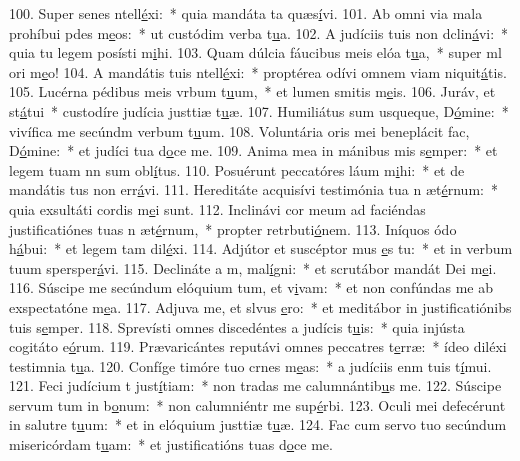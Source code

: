 100. Super senes ntell\uline{é}xi:~* quia mandáta ta quæs\uline{í}vi.
101. Ab omni via mala prohíbui pdes m\uline{e}os:~* ut custódim verba t\uline{u}a.
102. A judíciis tuis non dclin\uline{á}vi:~* quia tu legem posísti m\uline{i}hi.
103. Quam dúlcia fáucibus meis elóa t\uline{u}a,~* super ml ori m\uline{e}o!
104. A mandátis tuis ntell\uline{é}xi:~* proptérea odívi omnem viam niquit\uline{á}tis.
105. Lucérna pédibus meis vrbum t\uline{u}um,~* et lumen smitis m\uline{e}is.
106. Juráv, et st\uline{á}tui~* custodíre judícia justtiæ t\uline{u}æ.
107. Humiliátus sum usqueque, D\uline{ó}mine:~* vivífica me secúndm verbum t\uline{u}um.
108. Voluntária oris mei beneplácit fac, D\uline{ó}mine:~* et judíci tua d\uline{o}ce me.
109. Anima mea in mánibus mis s\uline{e}mper:~* et legem tuam nn sum obl\uline{í}tus.
110. Posuérunt peccatóres láum m\uline{i}hi:~* et de mandátis tus non err\uline{á}vi.
111. Hereditáte acquisívi testimónia tua n æt\uline{é}rnum:~* quia exsultáti cordis m\uline{e}i sunt.
112. Inclinávi cor meum ad faciéndas justificatiónes tuas n æt\uline{é}rnum,~* propter retrbuti\uline{ó}nem.
113. Iníquos ódo h\uline{á}bui:~* et legem tam dil\uline{é}xi.
114. Adjútor et suscéptor mus \uline{e}s tu:~* et in verbum tuum spersper\uline{á}vi.
115. Declináte a m, mal\uline{í}gni:~* et scrutábor mandát Dei m\uline{e}i.
116. Súscipe me secúndum elóquium tum, et v\uline{i}vam:~* et non confúndas me ab exspectatóne m\uline{e}a.
117. Adjuva me, et slvus \uline{e}ro:~* et meditábor in justificatiónibs tuis s\uline{e}mper.
118. Sprevísti omnes discedéntes a judícis t\uline{u}is:~* quia injústa cogitáto e\uline{ó}rum.
119. Prævaricántes reputávi omnes peccatres t\uline{e}rræ:~* ídeo diléxi testimnia t\uline{u}a.
120. Confíge timóre tuo crnes m\uline{e}as:~* a judíciis enm tuis t\uline{í}mui.
121. Feci judícium t just\uline{í}tiam:~* non tradas me calumnántib\uline{u}s me.
122. Súscipe servum tum in b\uline{o}num:~* non calumniéntr me sup\uline{é}rbi.
123. Oculi mei defecérunt in salutre t\uline{u}um:~* et in elóquium justtiæ t\uline{u}æ.
124. Fac cum servo tuo secúndum misericórdam t\uline{u}am:~* et justificatións tuas d\uline{o}ce me.
